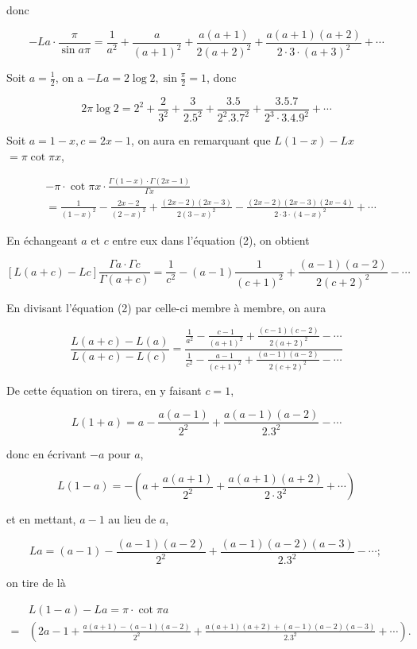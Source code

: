 \documentclass{article}
\begin{document}
donc

\[
-L a \cdot \frac{\pi}{\sin a \pi}=\frac{1}{a^{2}}+\frac{a}{(a+1)^{2}}+\frac{a(a+1)}{2(a+2)^{2}}+\frac{a(a+1)(a+2)}{2 \cdot 3 \cdot(a+3)^{2}}+\cdots
\]

Soit \(a=\frac{1}{2}\), on a \(-L a=2 \log 2, \sin \frac{\pi}{2}=1\), donc

\[
2 \pi \log 2=2^{2}+\frac{2}{3^{2}}+\frac{3}{2.5^{2}}+\frac{3.5}{2^{2} .3 .7^{2}}+\frac{3.5 .7}{2^{3} \cdot 3.4 .9^{2}}+\cdots
\]

Soit \(a=1-x, c=2 x-1\), on aura en remarquant que \(L(1-x)-L x\) \(=\pi \cot \pi x\),

\[
\begin{aligned}
& -\pi \cdot \cot \pi x \cdot \frac{\Gamma(1-x) \cdot \Gamma(2 x-1)}{\Gamma x} \\
& =\frac{1}{(1-x)^{2}}-\frac{2 x-2}{(2-x)^{2}}+\frac{(2 x-2)(2 x-3)}{2(3-x)^{2}}-\frac{(2 x-2)(2 x-3)(2 x-4)}{2 \cdot 3 \cdot(4-x)^{2}}+\cdots
\end{aligned}
\]

En échangeant \(a\) et \(c\) entre eux dans l'équation (2), on obtient

\[
[L(a+c)-L c] \frac{\Gamma a \cdot \Gamma c}{\Gamma(a+c)}=\frac{1}{c^{2}}-(a-1) \frac{1}{(c+1)^{2}}+\frac{(a-1)(a-2)}{2(c+2)^{2}}-\cdots
\]

En divisant l'équation (2) par celle-ci membre à membre, on aura

\[
\frac{L(a+c)-L(a)}{L(a+c)-L(c)}=\frac{\frac{1}{a^{2}}-\frac{c-1}{(a+1)^{2}}+\frac{(c-1)(c-2)}{2(a+2)^{2}}-\cdots}{\frac{1}{c^{2}}-\frac{a-1}{(c+1)^{2}}+\frac{(a-1)(a-2)}{2(c+2)^{2}}-\cdots}
\]

De cette équation on tirera, en \(\mathrm{y}\) faisant \(c=1\),

\[
L(1+a)=a-\frac{a(a-1)}{2^{2}}+\frac{a(a-1)(a-2)}{2.3^{2}}-\cdots
\]

donc en écrivant \(-a\) pour \(a\),

\[
L(1-a)=-\left(a+\frac{a(a+1)}{2^{2}}+\frac{a(a+1)(a+2)}{2 \cdot 3^{2}}+\cdots\right)
\]

et en mettant, \(a-1\) au lieu de \(a\),

\[
L a=(a-1)-\frac{(a-1)(a-2)}{2^{2}}+\frac{(a-1)(a-2)(a-3)}{2.3^{2}}-\cdots \text {; }
\]

on tire de là

\[
\begin{aligned}
& L(1-a)-L a=\pi \cdot \cot \pi a \\
= & \left(2 a-1+\frac{a(a+1)-(a-1)(a-2)}{2^{2}}+\frac{a(a+1)(a+2)+(a-1)(a-2)(a-3)}{2.3^{2}}+\cdots\right) .
\end{aligned}
\]
\end{document}
